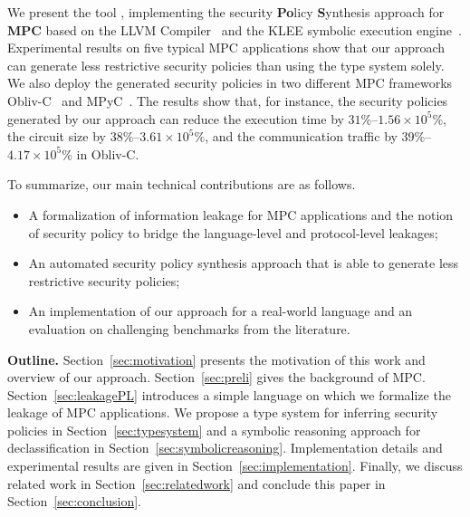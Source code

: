 We present the tool \TNAME, implementing the security \textbf{Po}licy \textbf{S}ynthesis approach for \textbf{MPC}  based on the LLVM Compiler~\cite{llvm} and the KLEE symbolic execution engine~\cite{CadarDE08}.
Experimental results on five typical MPC applications show that our approach can generate less restrictive security policies than using the type system solely.
We also %
deploy the generated security policies in two different MPC frameworks Obliv-C~\cite{ZahurE15} and MPyC~\cite{MPyC20}. The results show that, for instance,  the security policies generated by our approach can reduce the execution time
by $31\%$--$1.56\times 10^5\%$,  the circuit size by $38\%$--$3.61\times 10^5\%$, and the communication traffic by $39\%$--$4.17\times 10^5\%$  in Obliv-C.


To summarize, our main technical contributions are as follows.
\begin{itemize}
  \item A formalization of information leakage for MPC applications and the notion of security policy to bridge the language-level and protocol-level leakages;
  \item An automated security policy synthesis approach that is able to generate less restrictive security policies; %
  \item An implementation of our approach for a real-world language and an evaluation on challenging benchmarks from the literature.
\end{itemize}

\smallskip
\noindent
{\bf Outline.} %
Section~\ref{sec:motivation} presents the motivation of this work and overview of our approach.
Section~\ref{sec:preli} gives the background of MPC.
Section~\ref{sec:leakagePL} introduces a simple language on which we formalize the leakage of MPC applications.
We propose a type system for inferring security policies in Section~\ref{sec:typesystem}
and a symbolic reasoning approach for declassification in Section~\ref{sec:symbolicreasoning}.
Implementation details and experimental results are given in Section~\ref{sec:implementation}.
Finally, we discuss related work in Section~\ref{sec:relatedwork}
and conclude this paper in Section~\ref{sec:conclusion}.


